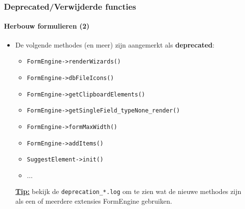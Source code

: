 \begin{frame}[fragile]
	\frametitle{Deprecated/Verwijderde functies}
	\framesubtitle{Herbouw formulieren (2)}

	\begin{itemize}

		\item De volgende methodes (en meer) zijn aangemerkt als \textbf{deprecated}:

			\begin{itemize}
				\item \texttt{FormEngine->renderWizards()}
				\item \texttt{FormEngine->dbFileIcons()}
				\item \texttt{FormEngine->getClipboardElements()}
				\item \texttt{FormEngine->getSingleField\_typeNone\_render()}
				\item \texttt{FormEngine->formMaxWidth()}
				\item \texttt{FormEngine->addItems()}
				\item \texttt{SuggestElement->init()}
				\item ...
			\end{itemize}

		\small
			\underline{\textbf{Tip:}}
			bekijk de \texttt{deprecation\_*.log} om te zien wat de nieuwe methodes zijn als een of meerdere
			extensies FormEngine gebruiken.
		\normalsize

	\end{itemize}

\end{frame}


